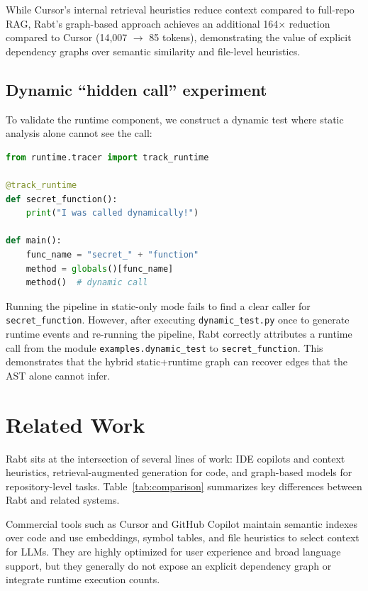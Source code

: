\documentclass[11pt]{article}
\begin{document}
While Cursor's internal retrieval heuristics reduce context compared to full-repo RAG, Rabt's graph-based approach achieves an additional 164$\times$ reduction compared to Cursor (14,007 $\rightarrow$ 85 tokens), demonstrating the value of explicit dependency graphs over semantic similarity and file-level heuristics.

\subsection{Dynamic ``hidden call'' experiment}

To validate the runtime component, we construct a dynamic test where static analysis alone cannot see the call:
\begin{lstlisting}[language=Python]
from runtime.tracer import track_runtime

@track_runtime
def secret_function():
    print("I was called dynamically!")

def main():
    func_name = "secret_" + "function"
    method = globals()[func_name]
    method()  # dynamic call
\end{lstlisting}

Running the pipeline in static-only mode fails to find a clear caller for \texttt{secret\_function}.
However, after executing \texttt{dynamic\_test.py} once to generate runtime events and re-running the pipeline, Rabt correctly attributes a runtime call from the module \texttt{examples.dynamic\_test} to \texttt{secret\_function}.
This demonstrates that the hybrid static+runtime graph can recover edges that the AST alone cannot infer.

\section{Related Work}

Rabt sits at the intersection of several lines of work:
IDE copilots and context heuristics, retrieval-augmented generation for code, and graph-based models for repository-level tasks.
Table~\ref{tab:comparison} summarizes key differences between Rabt and related systems.

Commercial tools such as Cursor and GitHub Copilot maintain semantic indexes over code and use embeddings, symbol tables, and file heuristics to select context for LLMs.
They are highly optimized for user experience and broad language support, but they generally do not expose an explicit dependency graph or integrate runtime execution counts.
\end{document}

